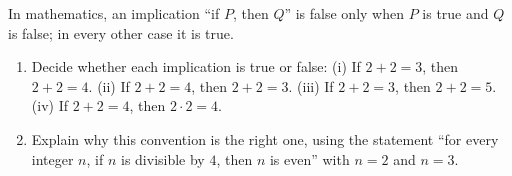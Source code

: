 In mathematics, an implication ``if $P$, then $Q$'' is false only when $P$ is true and $Q$ is false; in every other case it is true.
\begin{enumerate}
\item[(a)] Decide whether each implication is true or false:
(i) If $2+2=3$, then $2+2=4$. \quad (ii) If $2+2=4$, then $2+2=3$. \quad (iii) If $2+2=3$, then $2+2=5$. \quad (iv) If $2+2=4$, then $2\cdot2=4$.
\item[(b)] Explain why this convention is the right one, using the statement ``for every integer $n$, if $n$ is divisible by $4$, then $n$ is even'' with $n=2$ and $n=3$.
\end{enumerate}
